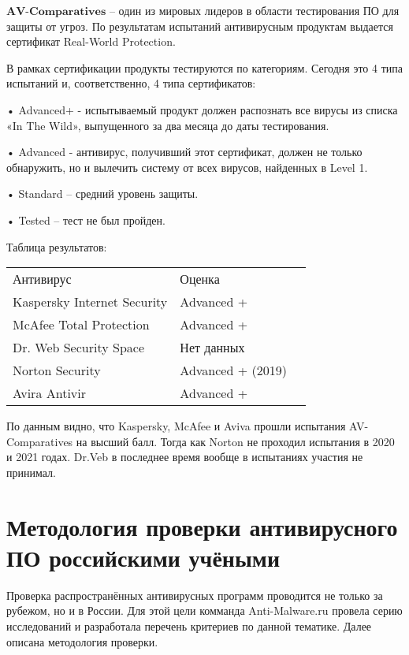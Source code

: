 \documentclass[%
preprint,
amsmath,amssymb,
aps,
]{revtex4-2}
\begin{document}
$\textbf{AV-Comparatives}$ – один из мировых лидеров в области тестирования ПО для защиты от угроз. По результатам испытаний антивирусным продуктам выдается сертификат Real-World Protection.

В рамках сертификации продукты тестируются по категориям. Сегодня это 4 типа испытаний и, соответственно, 4 типа сертификатов:

• Advanced+ - испытываемый продукт должен распознать все вирусы из списка «In The Wild», выпущенного за два месяца до даты тестирования.

• Advanced - антивирус, получивший этот сертификат, должен не только обнаружить, но и вылечить систему от всех вирусов, найденных в Level 1.

• Standard – средний уровень защиты.

• Tested – тест не был пройден.

Таблица результатов:

\begin{table}[h]
\begin{tabular}{|l|l|l}
\cline{1-2}
Антивирус                                            & Оценка            &  \\ \cline{1-2}
{\color[HTML]{202122} Kaspersky   Internet Security} & Advanced +        &  \\ \cline{1-2}
McAfee Total Protection                              & Advanced +        &  \\ \cline{1-2}
Dr. Web Security Space                               & Нет данных        &  \\ \cline{1-2}
Norton Security                                      & Advanced + (2019) &  \\ \cline{1-2}
Avira Antivir                                        & Advanced +        &  \\ \cline{1-2}
\end{tabular}
\end{table}

По данным видно, что Kaspersky, McAfee и Aviva прошли испытания AV-Comparatives на высший балл. Тогда как Norton не проходил испытания в 2020 и 2021 годах. Dr.Veb в последнее время вообще в испытаниях участия не принимал.

\section{Методология проверки антивирусного ПО российскими учёными}
Проверка распространённых антивирусных программ проводится не только за рубежом, но и в России. Для этой цели комманда Anti-Malware.ru провела серию исследований и разработала перечень критериев по данной тематике. Далее описана методология проверки.
\end{document}
